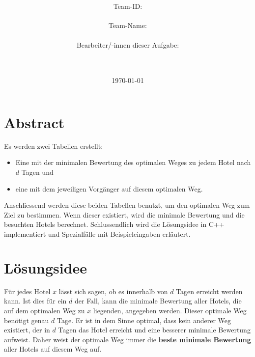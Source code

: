 \documentclass[a4paper,10pt,ngerman]{scrartcl}
\title{\textbf{\Huge\Aufgabe}}
\author{\LARGE Team-ID: \LARGE \TeamId \\\\
	    \LARGE Team-Name: \LARGE \TeamName \\\\
	    \LARGE Bearbeiter/-innen dieser Aufgabe: \\ 
	    \LARGE \Namen\\\\}
\date{\LARGE\today}
\begin{document}
\maketitle
\tableofcontents

\vspace{0.5cm}

\section{Abstract}
Es werden zwei Tabellen erstellt:
\begin{itemize}
    \item Eine mit der minimalen Bewertung des optimalen Weges zu jedem Hotel nach $d$ Tagen und
    \item eine mit dem jeweiligen Vorgänger auf diesem optimalen Weg.
\end{itemize}
Anschliessend werden diese beiden Tabellen benutzt, um den optimalen Weg zum Ziel zu bestimmen.
Wenn dieser existiert, wird die minimale Bewertung und die besuchten Hotels berechnet.
Schlussendlich wird die Lösungsidee in C++ implementiert und Spezialfälle mit Beispieleingaben erläutert.

\section{Lösungsidee}
Für jedes Hotel $x$ lässt sich sagen, ob es innerhalb von $d$ Tagen erreicht werden kann.
Ist dies für ein $d$ der Fall, kann die minimale Bewertung aller Hotels, die auf dem optimalen Weg zu $x$ liegenden, angegeben werden.
Dieser optimale Weg benötigt genau $d$ Tage.
Er ist in dem Sinne optimal, dass kein anderer Weg existiert, der in $d$ Tagen das Hotel erreicht und eine besserer minimale Bewertung aufweist.
Daher weist der optimale Weg immer die \textbf{beste minimale Bewertung} aller Hotels auf diesem Weg auf.
\end{document}
